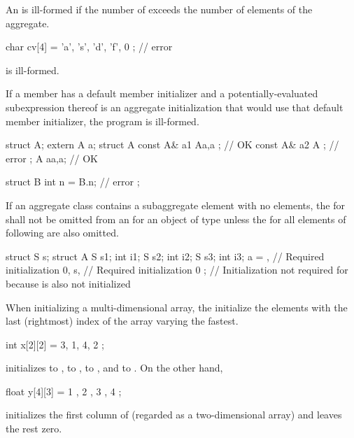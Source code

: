 \pnum
An
is ill-formed if the number of
exceeds the number of elements of the aggregate.
\begin{example}
\begin{codeblock}
char cv[4] = { 'a', 's', 'd', 'f', 0 };     // error
\end{codeblock}
is ill-formed.
\end{example}

\pnum
If a member has a default member initializer
and a potentially-evaluated subexpression thereof is an aggregate
initialization that would use that default member initializer,
the program is ill-formed.
\begin{example}
\begin{codeblock}
struct A;
extern A a;
struct A {
  const A& a1 { A{a,a} };       // OK
  const A& a2 { A{} };          // error
};
A a{a,a};                       // OK

struct B {
  int n = B{}.n;                // error
};
\end{codeblock}
\end{example}

\pnum
If an aggregate class  contains a subaggregate element
 with no elements,
the  for  shall not be
omitted from an  for an object of type
 unless the  for all
elements of  following  are also omitted.
\begin{example}
\begin{codeblock}
struct S { } s;
struct A {
  S s1;
  int i1;
  S s2;
  int i2;
  S s3;
  int i3;
} a = {
  { },              // Required initialization
  0,
  s,                // Required initialization
  0
};                  // Initialization not required for  because  is also not initialized
\end{codeblock}
\end{example}

\pnum
When initializing a multi-dimensional array,
the
initialize the elements with the last (rightmost) index of the array
varying the fastest.
\begin{example}
\begin{codeblock}
int x[2][2] = { 3, 1, 4, 2 };
\end{codeblock}
initializes
to
,
to
,
to
,
and
to
.
On the other hand,
\begin{codeblock}
float y[4][3] = {
  { 1 }, { 2 }, { 3 }, { 4 }
};
\end{codeblock}
initializes the first column of
(regarded as a two-dimensional array)
and leaves the rest zero.
\end{example}

